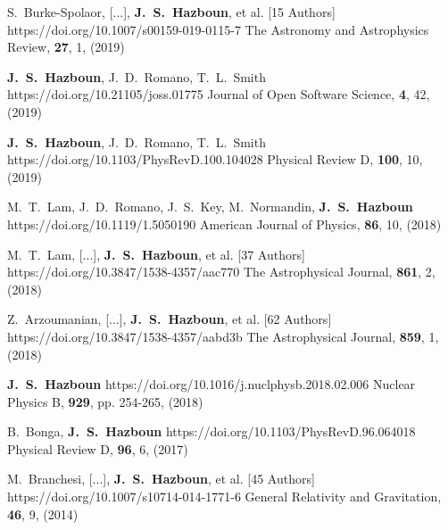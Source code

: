          {S.~{Burke-Spolaor}, [...], \textbf{J.~S.~{Hazboun}}, et al. [15 Authors]}
         {https://doi.org/10.1007/s00159-019-0115-7}
         {{The Astronomy and Astrophysics Review}, \textbf{27}, 1, (2019)}

         {\textbf{J.~S.~Hazboun}, J.~D.~{Romano}, T.~L.~{Smith}}
         {https://doi.org/10.21105/joss.01775}
         {{Journal of Open Software Science}, \textbf{4}, 42, (2019)}

         {\textbf{J.~S.~Hazboun}, J.~D.~{Romano}, T.~L.~{Smith}}
         {https://doi.org/10.1103/PhysRevD.100.104028}
         {{Physical Review D}, \textbf{100}, 10, (2019)}

         {M.~T.~{Lam}, J.~D.~{Romano}, J.~S.~{Key}, M.~{Normandin}, \textbf{J.~S.~Hazboun}}
         {https://doi.org/10.1119/1.5050190}
         {{American Journal of Physics}, \textbf{86}, 10, (2018)}

         {M.~T.~{Lam}, [...], \textbf{J.~S.~{Hazboun}}, et al. [37 Authors]}
         {https://doi.org/10.3847/1538-4357/aac770}
         {{The Astrophysical Journal}, \textbf{861}, 2, (2018)}

         {Z.~{Arzoumanian}, [...], \textbf{J.~S.~{Hazboun}}, et al. [62 Authors]}
         {https://doi.org/10.3847/1538-4357/aabd3b}
         {{The Astrophysical Journal}, \textbf{859}, 1, (2018)}

         {\textbf{J.~S.~Hazboun}}
         {https://doi.org/10.1016/j.nuclphysb.2018.02.006}
         {{Nuclear Physics B}, \textbf{929}, pp. 254-265, (2018)}

         {B.~{Bonga}, \textbf{J.~S.~Hazboun}}
         {https://doi.org/10.1103/PhysRevD.96.064018}
         {{Physical Review D}, \textbf{96}, 6, (2017)}

         {M.~{Branchesi}, [...], \textbf{J.~S.~{Hazboun}}, et al. [45 Authors]}
         {https://doi.org/10.1007/s10714-014-1771-6}
         {{General Relativity and Gravitation}, \textbf{46}, 9, (2014)}

